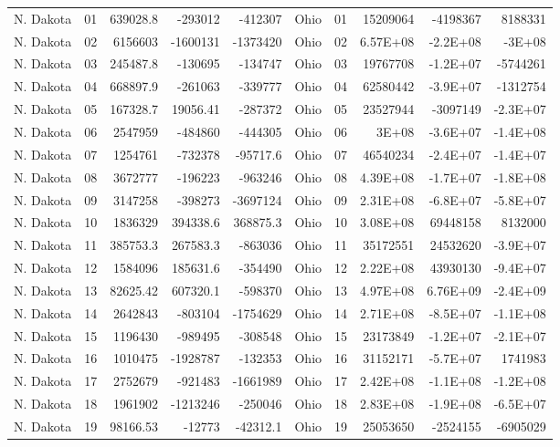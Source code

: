 \begin{landscape}
\begin{singlespace}
\begin{longtable}{lrrrr|lrrrr}
		N. Dakota &  01  & 639028.8 & -293012 & -412307 & Ohio &  01  & 15209064 & -4198367 & 8188331 \\
		N. Dakota &  02  & 6156603 & -1600131 & -1373420 & Ohio &  02  & 6.57E+08 & -2.2E+08 & -3E+08 \\
		N. Dakota &  03  & 245487.8 & -130695 & -134747 & Ohio &  03  & 19767708 & -1.2E+07 & -5744261 \\
		N. Dakota &  04  & 668897.9 & -261063 & -339777 & Ohio &  04  & 62580442 & -3.9E+07 & -1312754 \\
		N. Dakota &  05  & 167328.7 & 19056.41 & -287372 & Ohio &  05  & 23527944 & -3097149 & -2.3E+07 \\
		N. Dakota &  06  & 2547959 & -484860 & -444305 & Ohio &  06  & 3E+08 & -3.6E+07 & -1.4E+08 \\
		N. Dakota &  07  & 1254761 & -732378 & -95717.6 & Ohio &  07  & 46540234 & -2.4E+07 & -1.4E+07 \\
		N. Dakota &  08  & 3672777 & -196223 & -963246 & Ohio &  08  & 4.39E+08 & -1.7E+07 & -1.8E+08 \\
		N. Dakota &  09  & 3147258 & -398273 & -3697124 & Ohio &  09  & 2.31E+08 & -6.8E+07 & -5.8E+07 \\
		N. Dakota &  10 & 1836329 & 394338.6 & 368875.3 & Ohio &  10 & 3.08E+08 & 69448158 & 8132000 \\
		N. Dakota &  11 & 385753.3 & 267583.3 & -863036 & Ohio &  11 & 35172551 & 24532620 & -3.9E+07 \\
		N. Dakota &  12 & 1584096 & 185631.6 & -354490 & Ohio &  12 & 2.22E+08 & 43930130 & -9.4E+07 \\
		N. Dakota &  13 & 82625.42 & 607320.1 & -598370 & Ohio &  13 & 4.97E+08 & 6.76E+09 & -2.4E+09 \\
		N. Dakota &  14 & 2642843 & -803104 & -1754629 & Ohio &  14 & 2.71E+08 & -8.5E+07 & -1.1E+08 \\
		N. Dakota &  15 & 1196430 & -989495 & -308548 & Ohio &  15 & 23173849 & -1.2E+07 & -2.1E+07 \\
		N. Dakota &  16 & 1010475 & -1928787 & -132353 & Ohio &  16 & 31152171 & -5.7E+07 & 1741983 \\
		N. Dakota &  17 & 2752679 & -921483 & -1661989 & Ohio &  17 & 2.42E+08 & -1.1E+08 & -1.2E+08 \\
		N. Dakota &  18 & 1961902 & -1213246 & -250046 & Ohio &  18 & 2.83E+08 & -1.9E+08 & -6.5E+07 \\
		N. Dakota &  19 & 98166.53 & -12773 & -42312.1 & Ohio &  19 & 25053650 & -2524155 & -6905029 \\

\end{longtable}
\end{singlespace}
\end{landscape}
